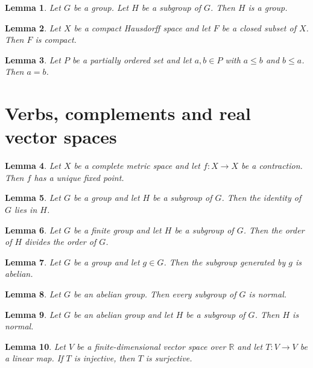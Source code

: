 \documentclass{article}
\newtheorem{lemma}{Lemma}
\begin{document}
\begin{lemma}\label{subgroup}
Let $G$ be a group. Let $H$ be a subgroup of $G$. Then $H$ is a group.
\end{lemma}

\begin{lemma}\label{compact}
Let $X$ be a compact Hausdorff space and let $F$ be a closed subset of $X$. Then $F$ is compact.
\end{lemma}

\begin{lemma}\label{order}
Let $P$ be a partially ordered set and let $a,b\in P$ with $a\le b$ and $b\le a$. Then $a=b$.
\end{lemma}

\section{Verbs, complements and real vector spaces}

\begin{lemma}\label{banach}
Let $X$ be a complete metric space and let $f\colon X\to X$ be a contraction. Then $f$ has a unique fixed point.
\end{lemma}

\begin{lemma}\label{identity-in-subgroup}
Let $G$ be a group and let $H$ be a subgroup of $G$. Then the identity of $G$ lies in $H$.
\end{lemma}

\begin{lemma}\label{lagrange}
Let $G$ be a finite group and let $H$ be a subgroup of $G$. Then the order of $H$ divides the order of $G$.
\end{lemma}

\begin{lemma}\label{generated}
Let $G$ be a group and let $g\in G$. Then the subgroup generated by $g$ is abelian.
\end{lemma}

\begin{lemma}\label{abelian-normal}
Let $G$ be an abelian group. Then every subgroup of $G$ is normal.
\end{lemma}

\begin{lemma}\label{abelian-normal-named}
Let $G$ be an abelian group and let $H$ be a subgroup of $G$. Then $H$ is normal.
\end{lemma}

\begin{lemma}\label{injective-surjective}
Let $V$ be a finite-dimensional vector space over $\mathbb{R}$ and let $T\colon V\to V$ be a linear map. If $T$ is injective, then $T$ is surjective.
\end{lemma}
\end{document}
